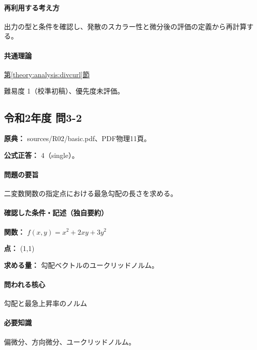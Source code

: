\paragraph{再利用する考え方} 出力の型と条件を確認し、発散のスカラー性と微分後の評価の定義から再計算する。

\paragraph{共通理論} \hyperref[theory:analysis:divcurl]{第\ref*{theory:analysis:divcurl}節}

\par 難易度 1（校準初稿）、優先度未評価。

\subsection{令和2年度 問3-2}
\label{q:r02-reg-basic-3-2}

\noindent\textbf{原典：} sources/R02/basic.pdf、PDF物理11頁。

\textbf{公式正答：} 4（single）。

\paragraph{問題の要旨} 二変数関数の指定点における最急勾配の長さを求める。

\paragraph{確認した条件・記述（独自要約）}\mbox{}\par

\noindent\textbf{関数：} \(f(x,y)=x^2+2xy+3y^2\)\par

\noindent\textbf{点：} (1,1)\par

\noindent\textbf{求める量：} 勾配ベクトルのユークリッドノルム。\par

\paragraph{問われる核心} 勾配と最急上昇率のノルム

\paragraph{必要知識} 偏微分、方向微分、ユークリッドノルム。


